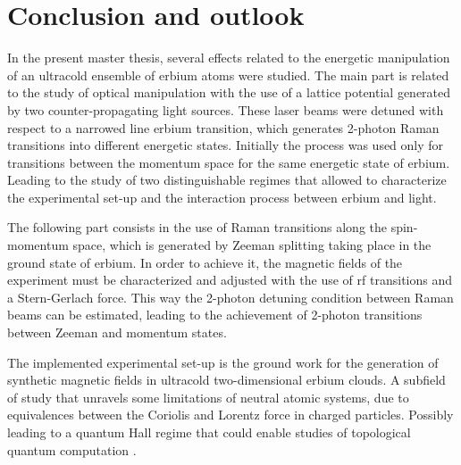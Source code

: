
\chapter{Conclusion and outlook}
\label{chap:outlook}

In the present master thesis, several effects related to the energetic manipulation of an ultracold ensemble of erbium atoms were studied. The main part is related to the study of optical manipulation with the use of a lattice potential generated by two counter-propagating light sources. These laser beams were detuned with respect to a narrowed line erbium transition, which generates 2-photon Raman transitions into different energetic states. Initially the process was used only for transitions between the momentum space for the same energetic state of erbium. Leading to the study of two distinguishable regimes that allowed to characterize the experimental set-up and the interaction process between erbium and light.

The following part consists in the use of Raman transitions along the spin-momentum space, which is generated by Zeeman splitting taking place in the ground state of erbium. In order to achieve it, the magnetic fields of the experiment must be characterized and adjusted with the use of \Acl{rf} transitions and a Stern-Gerlach force. This way the 2-photon detuning condition between Raman beams can be estimated, leading to the achievement of 2-photon transitions between Zeeman and momentum states.

The implemented experimental set-up is the ground work for the generation of synthetic magnetic fields in ultracold two-dimensional erbium clouds. A subfield of study that unravels some limitations of neutral atomic systems, due to equivalences between the Coriolis and Lorentz force in charged particles. Possibly leading to a quantum Hall regime that could enable studies of topological quantum computation \cite{Lin2009}.


